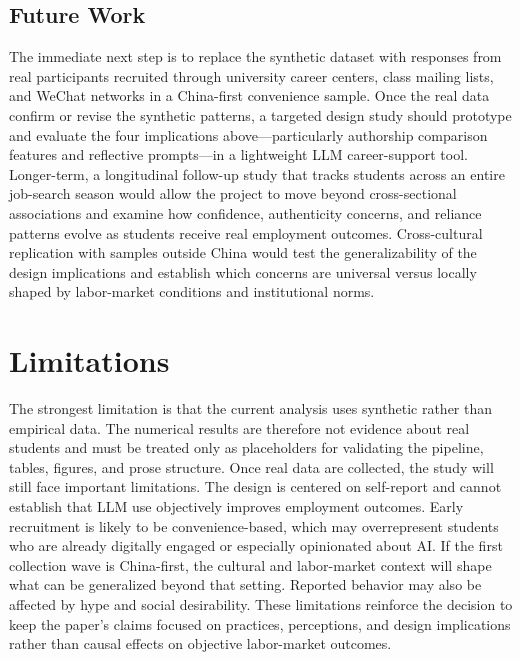 \documentclass[sigconf,review,anonymous]{acmart}
\begin{document}
\subsection{Future Work}

The immediate next step is to replace the synthetic dataset with responses from real participants recruited through university career centers, class mailing lists, and WeChat networks in a China-first convenience sample. Once the real data confirm or revise the synthetic patterns, a targeted design study should prototype and evaluate the four implications above---particularly authorship comparison features and reflective prompts---in a lightweight LLM career-support tool. Longer-term, a longitudinal follow-up study that tracks students across an entire job-search season would allow the project to move beyond cross-sectional associations and examine how confidence, authenticity concerns, and reliance patterns evolve as students receive real employment outcomes. Cross-cultural replication with samples outside China would test the generalizability of the design implications and establish which concerns are universal versus locally shaped by labor-market conditions and institutional norms.

\section{Limitations}
\label{sec:limitations}

The strongest limitation is that the current analysis uses synthetic rather than empirical data. The numerical results are therefore not evidence about real students and must be treated only as placeholders for validating the pipeline, tables, figures, and prose structure. Once real data are collected, the study will still face important limitations. The design is centered on self-report and cannot establish that LLM use objectively improves employment outcomes. Early recruitment is likely to be convenience-based, which may overrepresent students who are already digitally engaged or especially opinionated about AI. If the first collection wave is China-first, the cultural and labor-market context will shape what can be generalized beyond that setting. Reported behavior may also be affected by hype and social desirability. These limitations reinforce the decision to keep the paper's claims focused on practices, perceptions, and design implications rather than causal effects on objective labor-market outcomes.
\end{document}
